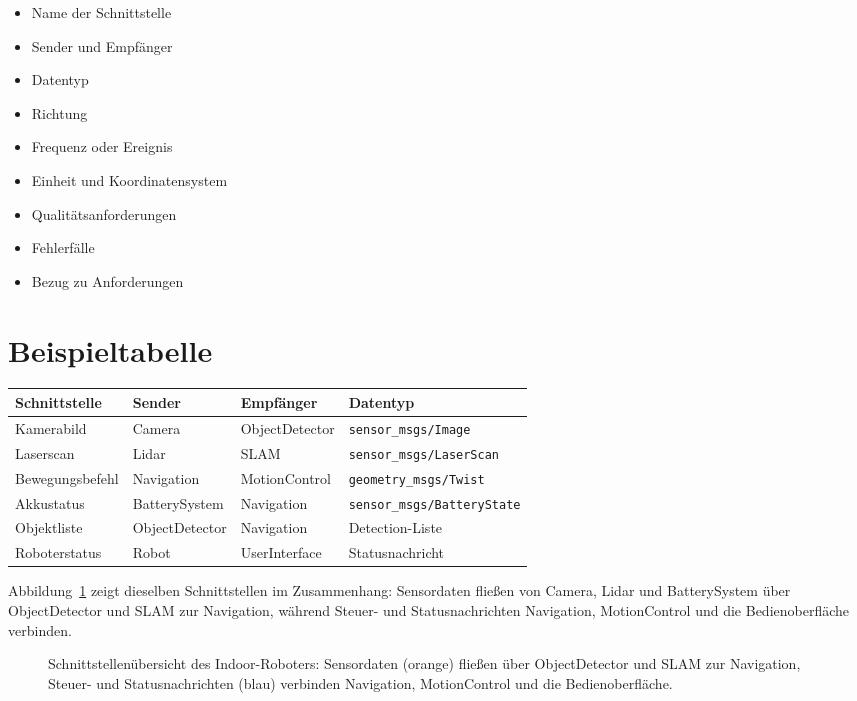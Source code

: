 \begin{itemize}
    \item Name der Schnittstelle
    \item Sender und Empfänger
    \item Datentyp
    \item Richtung
    \item Frequenz oder Ereignis
    \item Einheit und Koordinatensystem
    \item Qualitätsanforderungen
    \item Fehlerfälle
    \item Bezug zu Anforderungen
\end{itemize}

\section{Beispieltabelle}
\begingroup
\small
\setlength{\tabcolsep}{3pt}
\begin{longtable}{@{}p{}p{}p{}p{}@{}}
\toprule
Schnittstelle & Sender & Empfänger & Datentyp\\
\midrule
Kamerabild & Camera & ObjectDetector & \texttt{sensor\_msgs/}\newline\texttt{Image}\\
Laserscan & Lidar & SLAM & \texttt{sensor\_msgs/}\newline\texttt{LaserScan}\\
Bewegungsbefehl & Navigation & MotionControl & \texttt{geometry\_msgs/}\newline\texttt{Twist}\\
Akkustatus & BatterySystem & Navigation & \texttt{sensor\_msgs/}\newline\texttt{BatteryState}\\
Objektliste & ObjectDetector & Navigation & Detection-Liste\\
Roboterstatus & Robot & UserInterface & Statusnachricht\\
\bottomrule
\end{longtable}
\endgroup

Abbildung~\ref{fig:kap10-schnittstellenuebersicht} zeigt dieselben Schnittstellen im Zusammenhang: Sensordaten fließen von Camera, Lidar und BatterySystem über ObjectDetector und SLAM zur Navigation, während Steuer- und Statusnachrichten Navigation, MotionControl und die Bedienoberfläche verbinden.

\begin{figure}[H]
  \centering
  \caption{Schnittstellenübersicht des Indoor-Roboters: Sensordaten (orange) fließen über ObjectDetector und SLAM zur Navigation, Steuer- und Statusnachrichten (blau) verbinden Navigation, MotionControl und die Bedienoberfläche.}
  \label{fig:kap10-schnittstellenuebersicht}
\end{figure}

